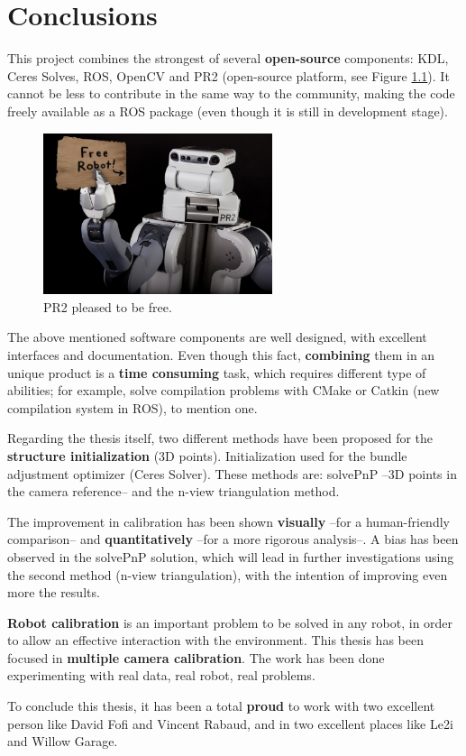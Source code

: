 \chapter{Conclusions}
\label{cha:conclusions}

This project combines the strongest of several \textbf{open-source} components: KDL, Ceres Solves, ROS, OpenCV and PR2 (open-source platform, see Figure \ref{fig:PR2_free_robot}). It cannot be less to contribute in the same way to the community, making the code freely available as a ROS package (even though it is still in development stage).

\begin{figure}[!htbp]
 \centering
 \includegraphics[width=0.6\textwidth]{images/PR2_free_robot.jpg}
 \caption{PR2 pleased to be free.}
 \label{fig:PR2_free_robot}
\end{figure}

The above mentioned software components are well designed, with excellent interfaces and documentation. Even though this fact, \textbf{combining} them in an unique product is a \textbf{time consuming} task, which requires different type of abilities; for example, solve compilation problems with CMake or Catkin (new compilation system in ROS), to mention one.

Regarding the thesis itself, two different methods have been proposed for the \textbf{structure initialization} (3D points). Initialization used for the bundle adjustment optimizer (Ceres Solver). These methods are: solvePnP --3D points in the camera reference-- and the n-view triangulation method.

The improvement in calibration has been shown \textbf{visually} --for a human-friendly comparison-- and \textbf{quantitatively} --for a more rigorous analysis--. A bias has been observed in the solvePnP solution, which will lead in further investigations using the second method (n-view triangulation), with the intention of improving even more the results.

\textbf{Robot calibration} is an important problem to be solved in any robot, in order to allow an effective interaction with the environment. This thesis has been focused in \textbf{multiple camera calibration}. The work has been done experimenting with real data, real robot, real problems.


To conclude this thesis, it has been a total \textbf{proud} to work with two excellent person like David Fofi and Vincent Rabaud, and in two excellent places like Le2i and Willow Garage.
